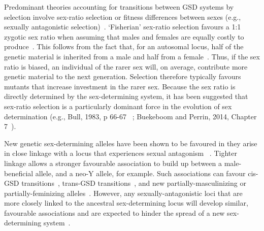 \documentclass[10pt,letterpaper]{article}
\begin{document}
Predominant theories accounting for transitions between GSD systems by selection involve sex-ratio selection or fitness differences between sexes (e.g., sexually antagonistic selection)~\cite{Blaser2012, Beukeboom:2014vb,vanDoorn2014re}. 
`Fisherian' sex-ratio selection favours a 1:1 zygotic sex ratio when assuming that males and females are equally costly to produce~\cite{Fisher:1930wy,Charnov:1982wg}.
This follows from the fact that, for an autosomal locus, half of the genetic material is inherited from a male and half from a female~\cite{West:2009we}. 
Thus, if the sex ratio is biased, an individual of the rarer sex will, on average, contribute more genetic material to the next generation. 
Selection therefore typically favours mutants that increase investment in the rarer sex.
Because the sex ratio is directly determined by the sex-determining system, it has been suggested that sex-ratio selection is a particularly dominant force in the evolution of sex determination (e.g., Bull, 1983, p 66-67 ~\cite{Bull:1983vi}; Buekeboom and Perrin, 2014, Chapter 7~\cite{Beukeboom:2014vb}). 

New genetic sex-determining alleles have been shown to be favoured in they arise in close linkage with a locus that experiences sexual antagonism ~\cite{vanDoorn:2007eu,vanDoorn:2010hu,Muralidhar2018}. 
Tighter linkage allows a stronger favourable association to build up between a male-beneficial allele, and a neo-Y allele, for example. 
Such associations can favour cis-GSD transitions~\cite{vanDoorn:2007eu}, trans-GSD transitions~\cite{vanDoorn:2010hu}, and new partially-masculinizing or partially-feminizing alleles~\cite{Muralidhar2018}.
However, any sexually-antagonistic loci that are more closely linked to the ancestral sex-determining locus will develop similar, favourable associations and are expected to hinder the spread of a new sex-determining system~\cite{vanDoorn:2007eu,vanDoorn:2010hu}. 
\end{document}
